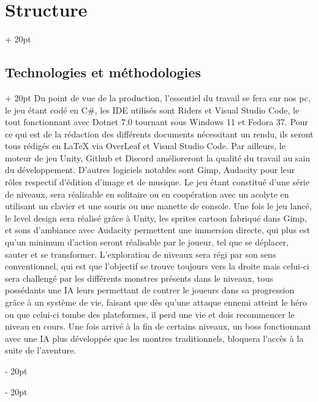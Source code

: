 \documentclass[a4paper, 12pt, twoside]{article}
\newcommand{\ind}[1][20pt]{\advance\leftskip + #1}
\newcommand{\deind}[1][20pt]{\advance\leftskip - #1}
\newenvironment{indt}[2][20pt]{#2 \par \ind[#1]}{\par \deind} %
\begin{document}
    \begin{indt}{\section{Structure}}
        \begin{indt}{\subsection{Technologies et méthodologies}}
            Du point de vue de la production, l'essentiel du travail se fera sur nos pc, le jeu étant codé en C$\#$, les IDE utilisés sont Riders et Visual Studio Code, le tout fonctionnant avec Dotnet 7.0 tournant sous Windows 11 et Fedora 37. Pour ce qui est de la rédaction des différents documents nécessitant un rendu, ils seront tous rédigés en LaTeX via OverLeaf et Visual Studio Code. Par ailleurs, le moteur de jeu Unity, Github et Discord amélioreront la qualité du travail au sain du développement. D'autres logiciels notables sont Gimp, Audacity pour leur rôles respectif d'édition d'image et de musique. Le jeu étant constitué d'une série de niveaux, sera réalisable en solitaire ou en coopération avec un acolyte en utilisant un clavier et une souris ou une manette de console. Une fois le jeu lancé, le level design sera réalisé grâce à Unity, les sprites cartoon fabriqué dans Gimp, et sons d'ambiance avec Audacity permettent une immersion directe, qui plus est qu'un minimum d'action seront réalisable par le joueur, tel que se déplacer, sauter et se transformer. L'exploration de niveaux sera régi par son sens conventionnel, qui est que l'objectif se trouve toujours vers la droite mais celui-ci sera challengé par les différents monstres présents dans le niveaux, tous possédants une IA leurs permettant de contrer le joueurs dans sa progression grâce à un système de vie, faisant que dès qu'une attaque ennemi atteint le héro ou que celui-ci tombe des plateformes, il perd une vie et dois recommencer le niveau en cours. Une fois arrivé à la fin de certains niveaux, un boss fonctionnant avec une IA plus développée que les montres traditionnels, bloquera l'accès à la suite de l'aventure.
        \end{indt}


\end{indt}
\end{document}
